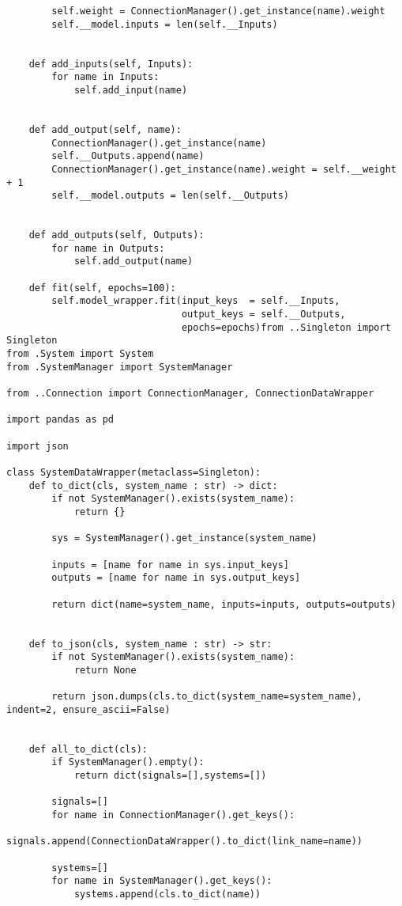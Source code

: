 \begin{lstlisting}
        self.weight = ConnectionManager().get_instance(name).weight
        self.__model.inputs = len(self.__Inputs)
    
    
    def add_inputs(self, Inputs):
        for name in Inputs:
            self.add_input(name)
    
        
    def add_output(self, name):
        ConnectionManager().get_instance(name)
        self.__Outputs.append(name)
        ConnectionManager().get_instance(name).weight = self.__weight + 1
        self.__model.outputs = len(self.__Outputs)
    
        
    def add_outputs(self, Outputs):
        for name in Outputs:
            self.add_output(name)
    
    def fit(self, epochs=100):
        self.model_wrapper.fit(input_keys  = self.__Inputs, 
                               output_keys = self.__Outputs,
                               epochs=epochs)from ..Singleton import Singleton
from .System import System
from .SystemManager import SystemManager

from ..Connection import ConnectionManager, ConnectionDataWrapper

import pandas as pd

import json

class SystemDataWrapper(metaclass=Singleton):
    def to_dict(cls, system_name : str) -> dict:
        if not SystemManager().exists(system_name):
            return {}
        
        sys = SystemManager().get_instance(system_name)
        
        inputs = [name for name in sys.input_keys]        
        outputs = [name for name in sys.output_keys]
        
        return dict(name=system_name, inputs=inputs, outputs=outputs)

    
    def to_json(cls, system_name : str) -> str:
        if not SystemManager().exists(system_name):
            return None
        
        return json.dumps(cls.to_dict(system_name=system_name), indent=2, ensure_ascii=False)

    
    def all_to_dict(cls):
        if SystemManager().empty():
            return dict(signals=[],systems=[])
        
        signals=[]
        for name in ConnectionManager().get_keys():
            signals.append(ConnectionDataWrapper().to_dict(link_name=name))
        
        systems=[]
        for name in SystemManager().get_keys():
            systems.append(cls.to_dict(name))
        

\end{lstlisting}
